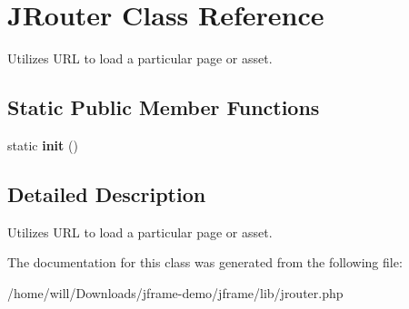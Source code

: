 \hypertarget{classJRouter}{\section{J\-Router Class Reference}
\label{classJRouter}
}


Utilizes U\-R\-L to load a particular page or asset.  


\subsection*{Static Public Member Functions}
\begin{DoxyCompactItemize}
\item 
\hypertarget{classJRouter_a2c806fde72156c952d2aaaead4f4d0df}{static {\bfseries init} ()}\label{classJRouter_a2c806fde72156c952d2aaaead4f4d0df}

\end{DoxyCompactItemize}


\subsection{Detailed Description}
Utilizes U\-R\-L to load a particular page or asset. 

The documentation for this class was generated from the following file\-:\begin{DoxyCompactItemize}
\item 
/home/will/\-Downloads/jframe-\/demo/jframe/lib/jrouter.\-php\end{DoxyCompactItemize}
